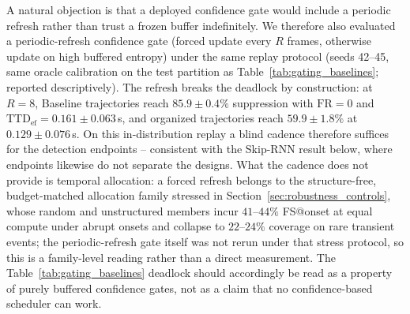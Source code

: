 \documentclass[a4paper,fleqn]{cas-dc}
\begin{document}
{{\color{\revcolor}A natural objection is that a deployed confidence gate would
include a periodic refresh rather than trust a frozen buffer indefinitely. We
therefore also evaluated a periodic-refresh confidence gate (forced update
every $R$ frames, otherwise update on high buffered entropy) under the same
replay protocol (seeds 42--45, same oracle calibration on the test partition
as Table~\ref{tab:gating_baselines}; reported descriptively). The refresh
breaks the deadlock by construction: at $R{=}8$,
Baseline trajectories reach $85.9 \pm 0.4\%$ suppression with
$\mathrm{FR}=0$ and $\mathrm{TTD}_{\mathrm{ef}} = 0.161 \pm 0.063$\,s, and
organized trajectories reach $59.9 \pm 1.8\%$ at $0.129 \pm 0.076$\,s. On
this in-distribution replay a blind cadence therefore suffices for the
detection endpoints -- consistent with the Skip-RNN result below, where
endpoints likewise do not separate the designs. What the cadence does not
provide is temporal allocation: a forced refresh belongs to the
structure-free, budget-matched allocation family stressed in
Section~\ref{sec:robustness_controls}, whose random and unstructured members
incur $41$--$44\%$ FS@onset at equal compute under abrupt onsets and collapse
to $22$--$24\%$ coverage on rare transient events; the periodic-refresh gate
itself was not rerun under that stress protocol, so this is a family-level
reading rather than a direct measurement. The Table~\ref{tab:gating_baselines}
deadlock should accordingly be read as a property of purely buffered
confidence gates, not as a claim that no confidence-based scheduler can
work.}

}
\end{document}

